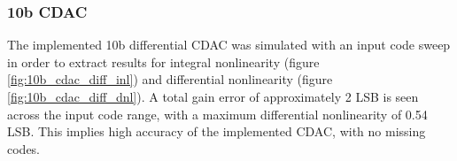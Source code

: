 \subsubsection{10b CDAC}\label{sec:res_cdac_10b}
The implemented 10b differential CDAC was simulated with an input code sweep in order to extract results for integral nonlinearity (figure \ref{fig:10b_cdac_diff_inl}) and differential nonlinearity (figure \ref{fig:10b_cdac_diff_dnl}). A total gain error of approximately 2 LSB is seen across the input code range, with a maximum differential nonlinearity of 0.54 LSB. This implies high accuracy of the implemented CDAC, with no missing codes. 



